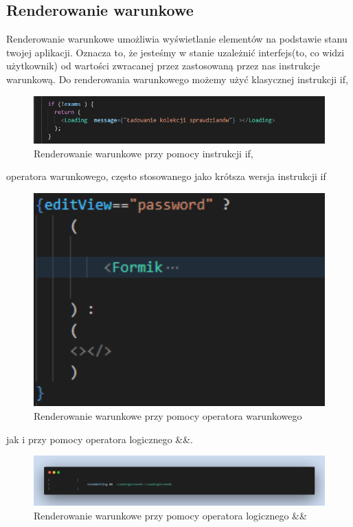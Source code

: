 \documentclass[oneside,polski,logo,indent]{amuthesis}
\begin{document}
\begin{enumerate}
\begin{enumerate}
{}


\subsection{Renderowanie warunkowe}

Renderowanie warunkowe umożliwia wyświetlanie elementów na podstawie stanu twojej aplikacji. Oznacza to, że jesteśmy w stanie uzależnić interfejs(to, co widzi użytkownik) od wartości zwracanej przez zastosowaną przez nas instrukcje warunkową.
Do renderowania warunkowego możemy użyć klasycznej instrukcji if,
\begin{figure}[H]
\centering
\includegraphics[width=13cm]{renderowanie z ifem.png}
\caption{Renderowanie warunkowe przy pomocy instrukcji if,
}

\end{figure}

operatora warunkowego, często stosowanego jako krótsza wersja instrukcji if
\begin{figure}[H]
\centering
\includegraphics[width=13cm]{Render operator warunkowy.png}
\caption{Renderowanie warunkowe przy pomocy operatora warunkowego
}

\end{figure}

\pagebreak
jak i przy pomocy operatora logicznego \&\&.

\begin{figure}[H]
\centering
\includegraphics[width=13cm]{render &&.png}
\caption{Renderowanie warunkowe przy pomocy operatora logicznego \&\&
}


\end{figure}
\end{enumerate}
\end{enumerate}
\end{document}

